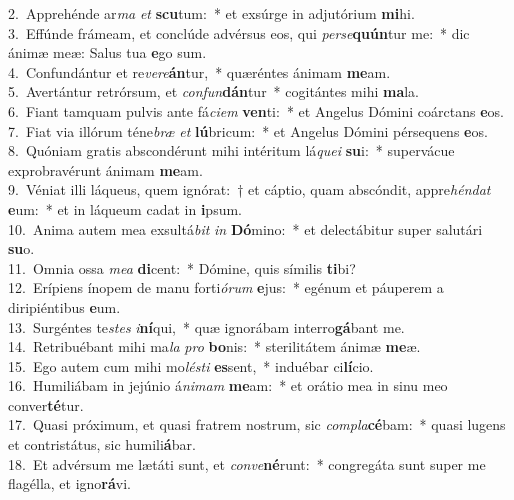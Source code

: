 {2.~}Apprehénde ar\textit{ma} \textit{et} \textbf{scu}tum:~* et exsúrge in adjutórium \textbf{mi}hi.\\
{3.~}Effúnde frámeam, et conclúde advérsus eos, qui \textit{per}\textit{se}\textbf{quún}tur me:~* dic ánimæ meæ: Salus tua \textbf{e}go sum.\\
{4.~}Confundántur et re\textit{ve}\textit{re}\textbf{án}tur,~* quæréntes ánimam \textbf{me}am.\\
{5.~}Avertántur retrórsum, et \textit{con}\textit{fun}\textbf{dán}tur~* cogitántes mihi \textbf{ma}la.\\
{6.~}Fiant tamquam pulvis ante fá\textit{ci}\textit{em} \textbf{ven}ti:~* et Angelus Dómini coárctans \textbf{e}os.\\
{7.~}Fiat via illórum téne\textit{bræ} \textit{et} \textbf{lú}bricum:~* et Angelus Dómini pérsequens \textbf{e}os.\\
{8.~}Quóniam gratis abscondérunt mihi intéritum lá\textit{que}\textit{i} \textbf{su}i:~* supervácue exprobravérunt ánimam \textbf{me}am.\\
{9.~}Véniat illi láqueus, quem ignórat:~† et cáptio, quam abscóndit, appre\textit{hén}\textit{dat} \textbf{e}um:~* et in láqueum cadat in \textbf{i}psum.\\
{10.~}Anima autem mea exsultá\textit{bit} \textit{in} \textbf{Dó}mino:~* et delectábitur super salutári \textbf{su}o.\\
{11.~}Omnia ossa \textit{me}\textit{a} \textbf{di}cent:~* Dómine, quis símilis \textbf{ti}bi?\\
{12.~}Erípiens ínopem de manu forti\textit{ó}\textit{rum} \textbf{e}jus:~* egénum et páuperem a diripiéntibus \textbf{e}um.\\
{13.~}Surgéntes te\textit{stes} \textit{i}\textbf{ní}qui,~* quæ ignorábam interro\textbf{gá}bant me.\\
{14.~}Retribuébant mihi ma\textit{la} \textit{pro} \textbf{bo}nis:~* sterilitátem ánimæ \textbf{me}æ.\\
{15.~}Ego autem cum mihi mo\textit{lé}\textit{sti} \textbf{es}sent,~* induébar ci\textbf{lí}cio.\\
{16.~}Humiliábam in jejúnio á\textit{ni}\textit{mam} \textbf{me}am:~* et orátio mea in sinu meo conver\textbf{té}tur.\\
{17.~}Quasi próximum, et quasi fratrem nostrum, sic \textit{com}\textit{pla}\textbf{cé}bam:~* quasi lugens et contristátus, sic humili\textbf{á}bar.\\
{18.~}Et advérsum me lætáti sunt, et \textit{con}\textit{ve}\textbf{né}runt:~* congregáta sunt super me flagélla, et igno\textbf{rá}vi.\\
